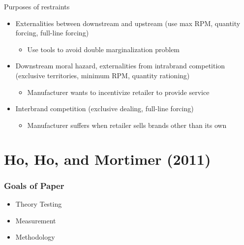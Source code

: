 
\begin{frame}
Purposes of restraints

\begin{itemize}
\item Externalities between downstream and upstream (use max RPM, quantity
forcing, full-line forcing)

\begin{itemize}
\item Use tools to avoid double marginalization problem
\end{itemize}

\item Downstream moral hazard, externalities from intrabrand competition
(exclusive territories, minimum RPM, quantity rationing)

\begin{itemize}
\item Manufacturer wants to incentivize retailer to provide service
\end{itemize}

\item Interbrand competition (exclusive dealing, full-line forcing)

\begin{itemize}
\item Manufacturer suffers when retailer sells brands other than its own
\end{itemize}
\end{itemize}
\end{frame}


\section{Ho, Ho, and Mortimer (2011)}

\begin{frame}
\frametitle{Goals of Paper}

\begin{itemize}
\item Theory Testing

\item Measurement

\item Methodology
\end{itemize}
\end{frame}

